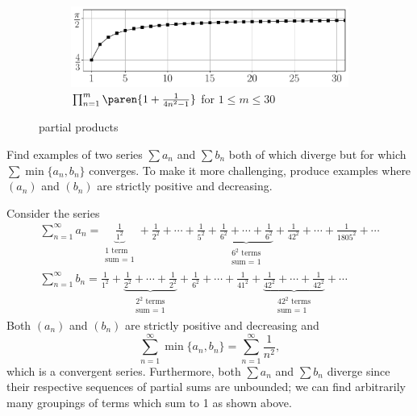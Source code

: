 \documentclass{lew98_solutions}
\begin{document}
\begin{solution}
\begin{figure}
\begin{subfigure}{0.9\textwidth}
        \end{subfigure} \\
        \begin{subfigure}{0.9\textwidth}
            \includegraphics[width=\textwidth]{UA_Figures/UA_ex2_7_10_fig_c.pdf}
            \caption{\( \prod_{n=1}^m \paren{ 1 + \frac{1}{4n^2 - 1} } \) for \( 1 \leq m \leq 30 \)}
        \end{subfigure}
        \caption{ partial products}
    \end{figure}
\end{solution}

\begin{exercise}
\label{ex:2.7.11}
    Find examples of two series \( \sum a_n \) and \( \sum b_n \) both of which diverge but for which \( \sum \min \{ a_n, b_n \} \) converges. To make it more challenging, produce examples where \( (a_n) \) and \( (b_n) \) are strictly positive and decreasing.
\end{exercise}

\begin{solution}
    Consider the series
    \begin{gather*}
        \sum_{n=1}^{\infty} a_n = \underbrace{\frac{1}{1^2}}_{\substack{1 \text{ term} \\ \text{sum = } 1}} + \frac{1}{2^2} + \cdots + \frac{1}{5^2} +  \underbrace{\frac{1}{6^2} + \cdots + \frac{1}{6^2}}_{\substack{6^2 \text{ terms} \\ \text{sum = } 1}} + \frac{1}{42^2} + \cdots + \frac{1}{1805^2} + \cdots \\[4mm]
        \sum_{n=1}^{\infty} b_n = \frac{1}{1^2} + \underbrace{\frac{1}{2^2} + \cdots + \frac{1}{2^2}}_{\substack{2^2 \text{ terms} \\ \text{sum = } 1}} + \frac{1}{6^2} + \cdots + \frac{1}{41^2} + \underbrace{\frac{1}{42^2} + \cdots + \frac{1}{42^2}}_{\substack{42^2 \text{ terms} \\ \text{sum = } 1}} + \cdots
    \end{gather*}
    Both \( (a_n) \) and \( (b_n) \) are strictly positive and decreasing and
    \[
        \sum_{n=1}^{\infty} \min \{ a_n, b_n \} = \sum_{n=1}^{\infty} \frac{1}{n^2},
    \]
    which is a convergent series. Furthermore, both \( \sum a_n \) and \( \sum b_n \) diverge since their respective sequences of partial sums are unbounded; we can find arbitrarily many groupings of terms which sum to 1 as shown above.
\end{solution}
\end{document}
